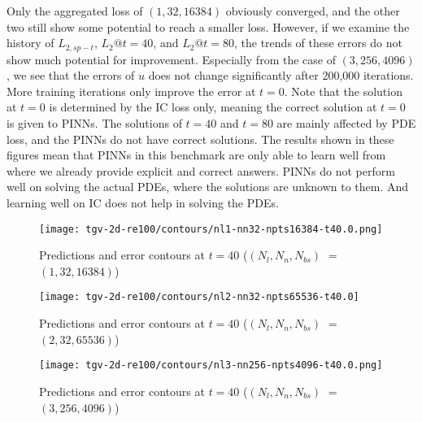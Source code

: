 Only the aggregated loss of $(1, 32, 16384)$ obviously converged, and the other two still show some potential to reach a smaller loss.
However, if we examine the history of $L_{2,sp-t}$, $L_2@t=40$, and $L_2@t=80$, the trends of these errors do not show much potential for improvement.
Especially from the case of $(3, 256, 4096)$, we see that the errors of $u$ does not change significantly after 200,000 iterations.
More training iterations only improve the error at $t=0$.
Note that the solution at $t=0$ is determined by the IC loss only, meaning the correct solution at $t=0$ is given to PINNs.
The solutions of $t=40$ and $t=80$ are mainly affected by PDE loss, and the PINNs do not have correct solutions.
The results shown in these figures mean that PINNs in this benchmark are only able to learn well from where we already provide explicit and correct answers.
PINNs do not perform well on solving the actual PDEs, where the solutions are unknown to them.
And learning well on IC does not help in solving the PDEs.

\begin{figure}[hbt!]
    \centering%
    \texttt{[image: tgv-2d-re100/contours/nl1-nn32-npts16384-t40.0.png]}
    \caption[%
        Predictions and error contours at $t=40$ for $(N_l, N_n, N_{bs})=(1, 32, 16384)$%
    ]{%
        Predictions and error contours at $t=40$ ($(N_l, N_n, N_{bs})$ $=$ $(1, 32, 16384)$)%
    }
    \label{fig:nl1-nn32-npts16384-t40-contours}
\end{figure}

\begin{figure}[hbt!]
    \centering%
    \texttt{[image: tgv-2d-re100/contours/nl2-nn32-npts65536-t40.0]}
    \caption[%
        Predictions and error contours at $t=40$ for $(N_l, N_n, N_{bs})=(2, 32, 65536)$%
    ]{%
        Predictions and error contours at $t=40$ ($(N_l, N_n, N_{bs})$ $=$ $(2, 32, 65536)$)%
    }
    \label{fig:nl2-nn32-npts65536-t40-contours}
\end{figure}

\begin{figure}[hbt!]
    \centering%
    \texttt{[image: tgv-2d-re100/contours/nl3-nn256-npts4096-t40.0.png]}
    \caption[%
        Predictions and error contours at $t=40$ for $(N_l, N_n, N_{bs})=(3, 256, 4096)$%
    ]{%
        Predictions and error contours at $t=40$ ($(N_l, N_n, N_{bs})$ $=$ $(3, 256, 4096)$)%
    }
    \label{fig:nl3-nn256-npts4096-t40-contours}
\end{figure}

